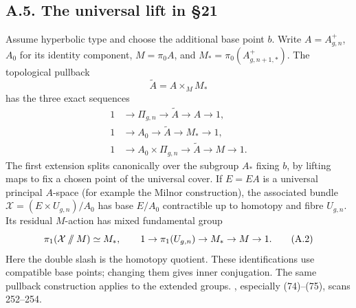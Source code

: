 
\subsection{A.5. The universal lift in \S21}

Assume hyperbolic type and choose the additional base point $b$. Write $A=A^+_{g,n}$, $A_0$ for its identity component, $M=\pi_0A$, and $M_*=\pi_0(A^+_{g,n+1,*})$. The topological pullback
\[
 \widetilde A=A\times_M M_*
\]
has the three exact sequences
\[
\begin{split}
1&\longrightarrow\Pi_{g,n}\longrightarrow\widetilde A
                 \longrightarrow A\longrightarrow1,\\
1&\longrightarrow A_0\longrightarrow\widetilde A
                 \longrightarrow M_*\longrightarrow1,\\
1&\longrightarrow A_0\times\Pi_{g,n}\longrightarrow\widetilde A
                 \longrightarrow M\longrightarrow1.
\end{split}                                                   \tag{A.1}
\]
The first extension splits canonically over the subgroup $A_*$ fixing $b$, by lifting maps to fix a chosen point of the universal cover. If $E=EA$ is a universal principal $A$-space (for example the Milnor construction), the associated bundle
$\mathcal X=(E\times U_{g,n})/A_0$ has base $E/A_0$ contractible up to homotopy and fibre $U_{g,n}$. Its residual $M$-action has mixed fundamental group
\[
 \pi_1(\mathcal X\mathbin{/\mkern-6mu/}M)\simeq M_*,
 \qquad
 1\to\pi_1(U_{g,n})\to M_*\to M\to1.                         \tag{A.2}
\]
Here the double slash is the homotopy quotient. These identifications use compatible base points; changing them gives inner conjugation. The same pullback construction applies to the extended groups.
, especially (74)--(75), scans 252--254.
